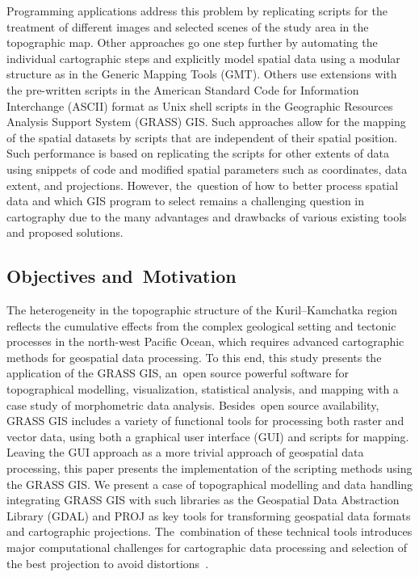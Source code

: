 \documentclass[technologies,article,accept,pdftex,moreauthors]{Definitions/mdpi}
\begin{document}
Programming applications address this problem by replicating scripts for the treatment of different images and selected scenes of the study area in the topographic map. Other approaches go one step further by automating {the }individual cartographic steps and explicitly model spatial data using {a modular structure }as in {the }Generic Mapping Tools (GMT){. Others} use extensions with {the }pre-written scripts in {the }American Standard Code for Information Interchange (ASCII) format as Unix shell scripts in the {Geographic Resources Analysis Support System (GRASS) GIS}. Such approaches allow for the mapping of {the spatial }datasets by scripts that are independent of their spatial position. {Such performance is based on} replicating the{ }scripts for other extents of data using snippets of code {and} modified spatial parameters {such as }coordinates, data extent, and projections{. }However, the~question of how to better process spatial data and which {GIS }program to select remains a challenging question in cartography due to the many advantages and drawbacks of various {existing }tools {and proposed solutions}. 

\subsection{Objectives and~Motivation}
The heterogeneity in the topographic structure of the Kuril--Kamchatka region reflects the cumulative effects from the complex geological setting and tectonic processes in the north-west Pacific Ocean, which requires advanced cartographic methods for geospatial data processing. To this end, this study presents the {application} of {the }GRASS{ }GIS, an~open source powerful software for topographical {modelling}, visualization, statistical{ }analysis, and mapping with a case study of{ }morphometric data analysis. Besides~open source availability, GRASS GIS includes a variety of functional tools for processing both raster and vector data, using both a graphical user interface (GUI) and scripts for mapping. Leaving the GUI approach as a more trivial{ }approach of geospatial data processing, this paper {presents} the {implementation} of {the }scripting methods {using the }GRASS GIS. We present a case of topographical modelling and data handling integrating GRASS GIS with such libraries as the Geospatial Data Abstraction Library (GDAL) and PROJ as key tools for transforming geospatial data formats and cartographic projections. The~combination of these technical tools introduces major computational challenges for cartographic data processing and {selection of the best} projection to avoid distortions~\cite{Kiani}.
\end{document}
